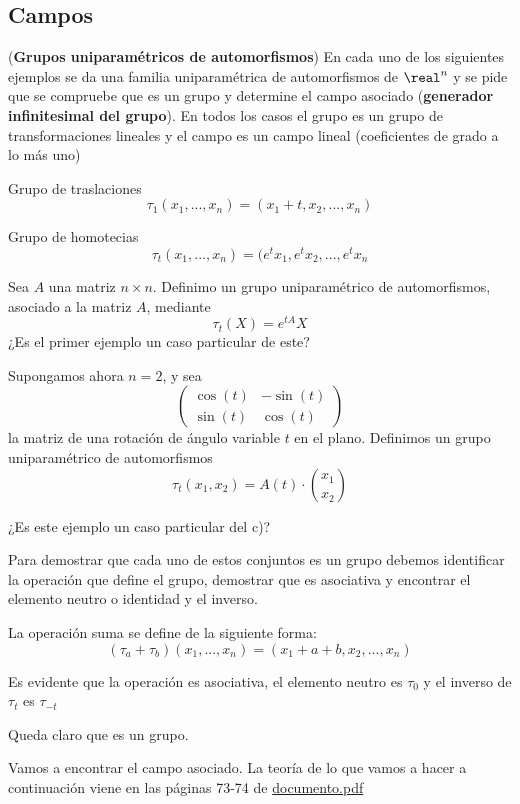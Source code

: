 \subsection{Campos}
\begin{problem}[1]
(\textbf{Grupos uniparamétricos de automorfismos}) En cada uno de los siguientes ejemplos se da una familia uniparamétrica de automorfismos de $\real^n$ y se pide que se compruebe que es un grupo y determine el campo asociado (\textbf{generador infinitesimal del grupo}). En todos los casos el grupo es un grupo de transformaciones lineales y el campo es un campo lineal (coeficientes de grado a lo más uno)

\ppart Grupo de traslaciones
\[τ_1(x_1,...,x_n)=(x_1+t,x_2,...,x_n)\]

\ppart Grupo de homotecias
\[τ_t(x_1,...,x_n)=(e^tx_1, e^tx_2,...,e^tx_n\]

\ppart Sea $A$ una matriz $n\times n$. Definimo un grupo uniparamétrico de automorfismos, asociado a la matriz $A$, mediante
\[τ_t(X)=e^{tA}X\]
¿Es el primer ejemplo un caso particular de este?

\ppart
Supongamos ahora $n=2$, y sea
\[ \left( \begin{array}{cc}

\cos(t) & -\sin(t) \\
\sin(t) & \cos(t)

\end{array} \right)\]
la matriz de una rotación de ángulo variable $t$ en el plano. Definimos un grupo uniparamétrico de automorfismos
\[τ_t(x_1,x_2)=A(t)\cdot {x_1 \choose x_2}\]

¿Es este ejemplo un caso particular del c)?

\solution
\yoP

Para demostrar que cada uno de estos conjuntos es un grupo debemos identificar la operación que define el grupo, demostrar que es asociativa y encontrar el elemento neutro o identidad y el inverso.

\spart
La operación suma se define de la siguiente forma:
\[(τ_a+τ_b)(x_1,...,x_n)=(x_1+a+b,x_2,...,x_n)\]

Es evidente que la operación es asociativa, el elemento neutro es $τ_0$ y el inverso de $τ_t$ es $τ_{-t}$

Queda claro que es un grupo.

Vamos a encontrar el campo asociado. La teoría de lo que vamos a hacer a continuación viene en las páginas 73-74 de \href{http://matematicas.unex.es/~ricarfr/EcDiferenciales/LibroEDLat.pdf}{documento.pdf}


\end{problem}
